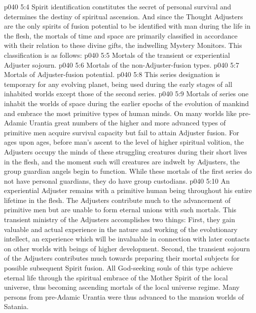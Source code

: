 \pc \vs p040 5:4 Spirit identification constitutes the secret of personal survival and determines the destiny of spiritual ascension. And since the Thought Adjusters are the only spirits of fusion potential to be identified with man during the life in the flesh, the mortals of time and space are primarily classified in accordance with their relation to these divine gifts, the indwelling Mystery Monitors. This classification is as follows:
\pc \vs p040 5:5 \bibnobreakspace Mortals of the transient or experiential Adjuster sojourn.
\vs p040 5:6 \bibnobreakspace Mortals of the non\hyp{}Adjuster\hyp{}fusion types.
\vs p040 5:7 \bibnobreakspace Mortals of Adjuster\hyp{}fusion potential.
\pc \vs p040 5:8  This series designation is temporary for any evolving planet, being used during the early stages of all inhabited worlds except those of the second series.
\vs p040 5:9 Mortals of series one inhabit the worlds of space during the earlier epochs of the evolution of mankind and embrace the most primitive types of human minds. On many worlds like pre\hyp{}Adamic Urantia great numbers of the higher and more advanced types of primitive men acquire survival capacity but fail to attain Adjuster fusion. For ages upon ages, before man’s ascent to the level of higher spiritual volition, the Adjusters occupy the minds of these struggling creatures during their short lives in the flesh, and the moment such will creatures are indwelt by Adjusters, the group guardian angels begin to function. While these mortals of the first series do not have personal guardians, they do have group custodians.
\vs p040 5:10 An experiential Adjuster remains with a primitive human being throughout his entire lifetime in the flesh. The Adjusters contribute much to the advancement of primitive men but are unable to form eternal unions with such mortals. This transient ministry of the Adjusters accomplishes two things: First, they gain valuable and actual experience in the nature and working of the evolutionary intellect, an experience which will be invaluable in connection with later contacts on other worlds with beings of higher development. Second, the transient sojourn of the Adjusters contributes much towards preparing their mortal subjects for possible subsequent Spirit fusion. All God\hyp{}seeking souls of this type achieve eternal life through the spiritual embrace of the Mother Spirit of the local universe, thus becoming ascending mortals of the local universe regime. Many persons from pre\hyp{}Adamic Urantia were thus advanced to the mansion worlds of Satania.

